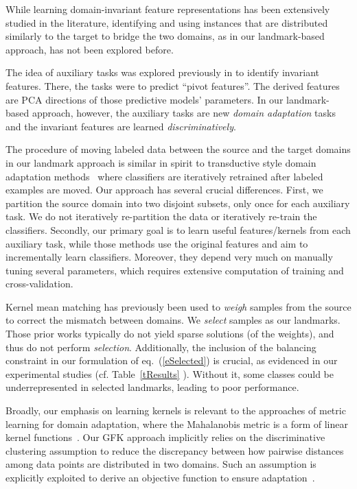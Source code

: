 While learning domain-invariant feature representations has been extensively studied in the literature, identifying and using instances that are distributed similarly to the target to bridge the two domains, as in our landmark-based approach,  has not been explored before.

The idea of auxiliary tasks was explored previously in \cite{BlitzerEMNLP06Domain} to identify invariant features. There, the tasks were to predict ``pivot features''. The derived features are PCA directions of those predictive models' parameters.  In our landmark-based approach,  however, the auxiliary tasks are new \emph{domain adaptation} tasks and the invariant features are learned \emph{discriminatively}. 

The procedure of moving labeled data between the source and the target domains in our landmark approach is similar in spirit to transductive style domain adaptation methods~\cite{bergamo09weak,bruzzone2010domain,chen11cotrain} where classifiers are iteratively retrained after labeled examples are moved.  Our approach has several crucial differences. First, we partition the source domain into two disjoint subsets, only once for each auxiliary task. We do not iteratively re-partition the data or iteratively re-train the classifiers.  Secondly, our primary goal is to learn useful features/kernels from each auxiliary task, while those methods  use the original features and aim to incrementally learn classifiers. Moreover, they depend very much on manually tuning several  parameters, which requires extensive computation of training and cross-validation.

Kernel mean matching has previously been used to \emph{weigh} samples from the source \cite{huang07correcting,tca,gretton09kmm} to correct the mismatch between domains. We \emph{select} samples as our landmarks. Those prior works typically do not yield sparse solutions (of the weights), and thus do not perform \emph{selection}.  Additionally, the inclusion of the balancing constraint in our formulation of eq.~(\ref{eSelected}) is crucial, as evidenced in our experimental studies (cf. Table~\ref{tResults} ). Without it, some classes could be underrepresented in selected landmarks, leading to poor performance.%

Broadly, our emphasis on learning kernels is relevant to the approaches of metric learning for domain adaptation, where the Mahalanobis metric  is a form of linear kernel functions~\cite{saenko2010adapting,kulisyou,shi2012}. Our GFK approach implicitly relies on the discriminative clustering assumption to reduce the discrepancy between how pairwise distances among data points are distributed in two domains. Such an assumption is explicitly exploited to derive an objective function to ensure adaptation~\cite{shi2012}. 

